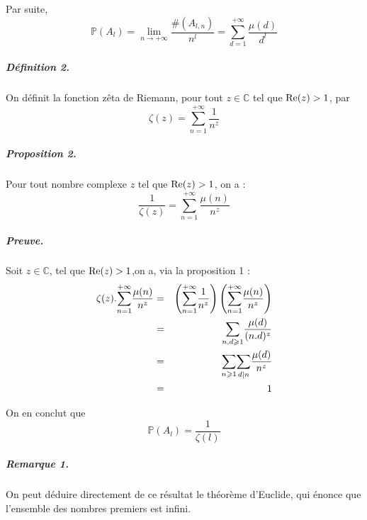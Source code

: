 Par suite,
\[ \mathbb{P} (A_l) = \underset{n \rightarrow + \infty}{\lim} \frac{\# (A_{l,
   n})}{n^l} = \underset{d = 1}{\overset{+ \infty}{\sum}} \frac{\mu (d)}{d^l}
\]


\subparagraph{D{\'e}finition 2.}

On d{\'e}finit la fonction z{\^e}ta de Riemann, pour tout $z \in \mathbb{C}$
tel que $\operatorname{Re} (z) > 1$, par
\[ \zeta (z) = \underset{n = 1}{\overset{+ \infty}{\sum}} \frac{1}{n^z} \]


\subparagraph{Proposition 2.}

Pour tout nombre complexe $z$ tel que $\operatorname{Re} (z) > 1$, on a :
\[ \frac{1}{\zeta (z)} = \underset{n = 1}{\overset{+ \infty}{\sum}} \frac{\mu
   (n)}{n^z} \]

\subparagraph{Preuve.}

Soit $z \in \mathbb{C}$, tel que $\operatorname{Re} (z) > 1$,on a, via la proposition
1 :
\begin{eqnarray*}
  \zeta (z) . \underset{n = 1}{\overset{+ \infty}{\sum}} \frac{\mu (n)}{n^z} &
  = & \left( \underset{n = 1}{\overset{+ \infty}{\sum}} \frac{1}{n^z} \right)
  \left( \underset{n = 1}{\overset{+ \infty}{\sum}} \frac{\mu (n)}{n^z}
  \right)\\
  & = & \underset{n, d \geqslant 1}{\overset{}{\sum}} \frac{\mu
  (d)}{(n.d)^z}\\
  & = & \underset{n \geqslant 1}{\overset{}{\sum}} \underset{d | n
  }{\overset{}{\sum}} \frac{\mu (d)}{n^z}\\
  & = & 1
\end{eqnarray*}


On en conclut que
\[ \mathbb{P} (A_l) = \frac{1}{\zeta (l)} \]


\subparagraph{Remarque 1.}

On peut d{\'e}duire directement de ce r{\'e}sultat le th{\'e}or{\`e}me d'Euclide, qui {\'e}nonce que l'ensemble des nombres premiers est infini.